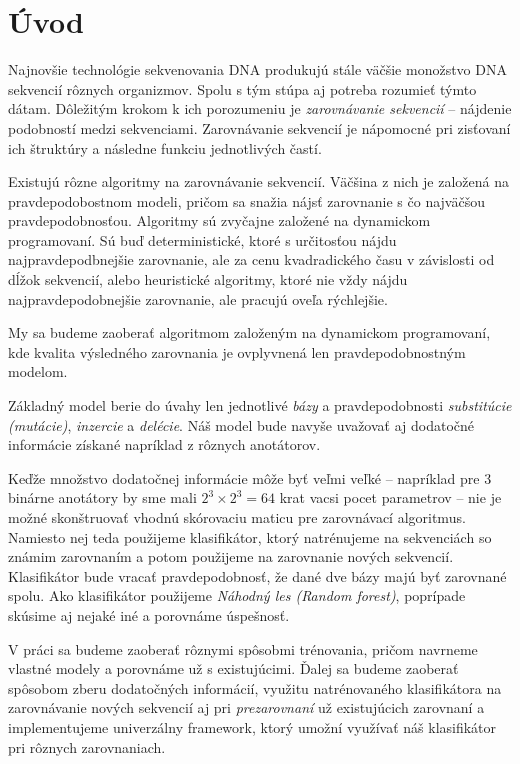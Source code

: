 \chapter*{Úvod}
{}

Najnovšie technológie sekvenovania DNA produkujú stále väčšie monožstvo DNA sekvencií rôznych organizmov. Spolu s tým stúpa aj potreba rozumieť týmto dátam. 
Dôležitým krokom k ich porozumeniu je \textit{zarovnávanie sekvencií} -- nájdenie podobností medzi sekvenciami.
Zarovnávanie sekvencií je nápomocné pri zisťovaní ich štruktúry a následne funkciu jednotlivých častí.

Existujú rôzne algoritmy na zarovnávanie sekvencií. Väčšina z nich je založená na  pravdepodobostnom modeli, pričom sa snažia nájsť zarovnanie s čo najväčšou pravdepodobnosťou.
Algoritmy sú zvyčajne založené na dynamickom programovaní. Sú buď deterministické, ktoré s určitosťou nájdu najpravdepodbnejšie zarovnanie, ale za cenu kvadradického času v závislosti od dĺžok sekvencií, alebo heuristické algoritmy, ktoré nie vždy nájdu najpravdepodobnejšie zarovnanie, ale pracujú oveľa rýchlejšie.

My sa budeme zaoberať algoritmom založeným na dynamickom programovaní, kde kvalita výsledného zarovnania je ovplyvnená len pravdepodobnostným modelom.

Základný model berie do úvahy len jednotlivé \textit{bázy} a pravdepodobnosti \textit{substitúcie (mutácie)}, \textit{inzercie} a \textit{delécie}.
Náš model bude navyše uvažovať aj dodatočné informácie získané napríklad z rôznych anotátorov.

Keďže množstvo dodatočnej informácie môže byť veľmi veľké -- napríklad pre 3 binárne anotátory by sme mali $2^3 \times 2^3 = 64$ krat vacsi pocet parametrov --
nie je možné skonštruovať vhodnú skórovaciu maticu pre zarovnávací algoritmus.
Namiesto nej teda použijeme klasifikátor, ktorý natrénujeme na sekvenciách so známim zarovnaním a potom použijeme na zarovnanie nových sekvencií. Klasifikátor bude vracať pravdepodobnosť, že dané dve bázy majú byť zarovnané spolu. 
Ako klasifikátor použijeme \textit{Náhodný les (Random forest)}, poprípade skúsime aj nejaké iné a porovnáme úspešnosť.


V práci sa budeme zaoberať rôznymi spôsobmi trénovania, pričom navrneme vlastné modely a porovnáme už s existujúcimi. Ďalej sa budeme zaoberať spôsobom zberu dodatočných informácií, využitu natrénovaného klasifikátora na zarovnávanie nových sekvencií aj pri \textit{prezarovnaní} už existujúcich zarovnaní a implementujeme univerzálny framework, ktorý umožní využívať náš klasifikátor pri rôznych zarovnaniach.

